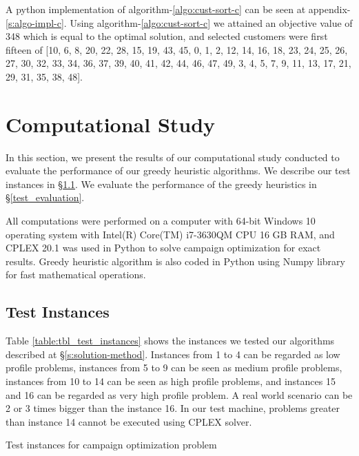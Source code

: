 \documentclass[11pt]{article}
\begin{document}
 A python implementation of algorithm-\ref{algo:cust-sort-c} can be seen at appendix-\ref{s:algo-impl-c}. Using algorithm-\ref{algo:cust-sort-c} we attained an objective value of 348 which is equal to the optimal solution, and selected customers were first fifteen of [10, 6, 8, 20, 22, 28, 15, 19, 43, 45, 0, 1, 2, 12, 14, 16, 18, 23, 24, 25, 26, 27, 30, 32, 33, 34, 36, 37, 39, 40, 41, 42, 44, 46, 47, 49, 3, 4, 5, 7, 9, 11, 13, 17, 21, 29, 31, 35, 38, 48].

\newpage
\section{Computational Study} \label{s:num-analysis}

In this section, we present the results of our computational study conducted to evaluate the performance of our greedy heuristic algorithms. We describe our test instances in \S \ref{test_cases}. We evaluate the performance of the greedy heuristics in \S \ref{test_evaluation}.

All computations were performed on a computer with 64-bit Windows 10 operating system with Intel(R) Core(TM) i7-3630QM CPU 16 GB RAM, and CPLEX 20.1 was used in Python to solve campaign optimization for exact results. Greedy heuristic algorithm is also coded in Python using Numpy library for fast mathematical operations.

\subsection{Test Instances} \label{test_cases}
Table \ref{table:tbl_test_instances} shows the instances we tested our algorithms described at \S \ref{s:solution-method}. Instances from 1 to 4 can be regarded as low profile problems, instances from 5 to 9 can be seen as medium profile problems, instances from 10 to 14 can be seen as high profile problems, and instances 15 and 16 can be regarded as very high profile problem. A real world scenario can be 2 or 3 times bigger than the instance 16. In our test machine, problems greater than instance 14 cannot be executed using CPLEX solver.\\
 
\begin{table}[htb]
    \centering
    \caption[Short Caption for LoT]{Test instances for campaign optimization problem}\label{table:tbl_test_instances}
\end{table}
\end{document}
